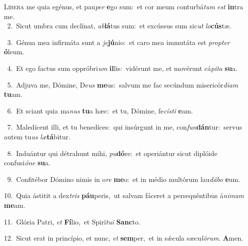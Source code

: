 \lettrine{\initial\textcolor{\initialcolor}{L}}{íbera} me quia egénus, et pau\textit{per} \textbf{e}\-go sum:~\star et cor meum conturbá\textit{tum} \textit{est} \textbf{in}\-tra me.\\
{\numbfont\textcolor{\numbcolor}{~2.}}~Sicut umbra cum declínat, \textit{ab}\-\textbf{lá}tus sum:~\star et excússus sum sic\textit{ut} \textit{lo}\-\textbf{cús}tæ.\par
{\numbfont\textcolor{\numbcolor}{~3.}}~Génua mea infirmáta sunt a \textit{je}\-\textbf{jú}nio:~\star et caro mea immutáta est \textit{prop}\-\textit{ter} \textbf{ó}\-leum.\par
{\numbfont\textcolor{\numbcolor}{~4.}}~Et ego factus sum oppróbri\textit{um} \textbf{il}\-lis:~\star vidérunt me, et movérunt cá\-\textit{pi}\-\textit{ta} \textbf{su}\-a.\par
{\numbfont\textcolor{\numbcolor}{~5.}}~Adjuva me, Dómine, De\textit{us} \textbf{me}\-us:~\star salvum me fac secúndum misericór\-\textit{di}\-\textit{am} \textbf{tu}\-am.\par
{\numbfont\textcolor{\numbcolor}{~6.}}~Et sciant quia ma\textit{nus} \textbf{tu}\-a hæc:~\star et tu, Dómine, fe\-\textit{cís}\-\textit{ti} \textbf{e}\-am.\par
{\numbfont\textcolor{\numbcolor}{~7.}}~Maledícent illi, et tu benedíces:~\dagger qui insúrgunt in me, con\-\textit{fun}\-\textbf{dán}tur:~\star servus autem tu\textit{us} \textit{læ}\-\textbf{tá}bitur.\par
{\numbfont\textcolor{\numbcolor}{~8.}}~Induántur qui détrahunt mihi, \textit{pu}\-\textbf{dó}re:~\star et operiántur sicut diplóide confusi\-\textit{ó}\-\textit{ne} \textbf{su}\-a.\par
{\numbfont\textcolor{\numbcolor}{~9.}}~Confitébor Dómino nimis in o\textit{re} \textbf{me}\-o:~\star et in médio multórum lau\-\textit{dá}\-\textit{bo} \textbf{e}\-um.\par
{\numbfont\textcolor{\numbcolor}{10.}}~Quia ástitit a dex\textit{tris} \textbf{páu}\-peris,~\star ut salvam fáceret a persequéntibus á\-\textit{ni}\-\textit{mam} \textbf{me}\-am.\par
{\numbfont\textcolor{\numbcolor}{11.}}~Glória Patri, \textit{et} \textbf{Fí}\-lio,~\star et Spirí\-\textit{tu}\-\textit{i} \textbf{Sanc}\-to.\par
{\numbfont\textcolor{\numbcolor}{12.}}~Sicut erat in princípio, et nunc, \textit{et} \textbf{sem}\-per,~\star et in sǽcula sæcu\-\textit{ló}\-\textit{rum}. \textbf{A}\-men.\par

